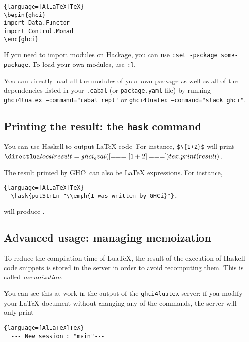 \documentclass{article}
\begin{document}
\begin{lstlisting}{language=[AlLaTeX]TeX}
\begin{ghci}
import Data.Functor
import Control.Monad
\end{ghci}
\end{lstlisting}

If you need to import modules on Hackage, you can use \texttt{:set -package some-package}. To load your own modules, use \texttt{:l}.

\begin{tipbox}
  You can directly load all the modules of your own package as well as all of the dependencies listed in your \texttt{.cabal} (or \texttt{package.yaml} file) by running \texttt{ghci4luatex --command="cabal repl"} or \texttt{ghci4luatex --command="stack ghci"}.
\end{tipbox}

\subsection{Printing the result: the \texttt{hask} command}

You can use Haskell to output LaTeX code. For instance, \texttt{\$\textbackslash {}\{1+2\}\$} will print $\hask{1 + 2}$.


The result printed by GHCi can also be  LaTeX expressions. For instance,

\begin{lstlisting}{language=[AlLaTeX]TeX}
  \hask{putStrLn "\\emph{I was written by GHCi}"}.
\end{lstlisting}
\noindent
will produce .



\subsection{Advanced usage: managing memoization}

To reduce the compilation time of LuaTeX, the result of the execution of Haskell code snippets is stored in the server in order to avoid recomputing them. This is called \emph{memoization}.

You can see this at work in the output of the \texttt{ghci4luatex} server: if you modify your LaTeX document without changing any of the commands, the server will only print

\begin{lstlisting}{language=[AlLaTeX]TeX}
  --- New session : "main"---
\end{lstlisting}
\end{document}
